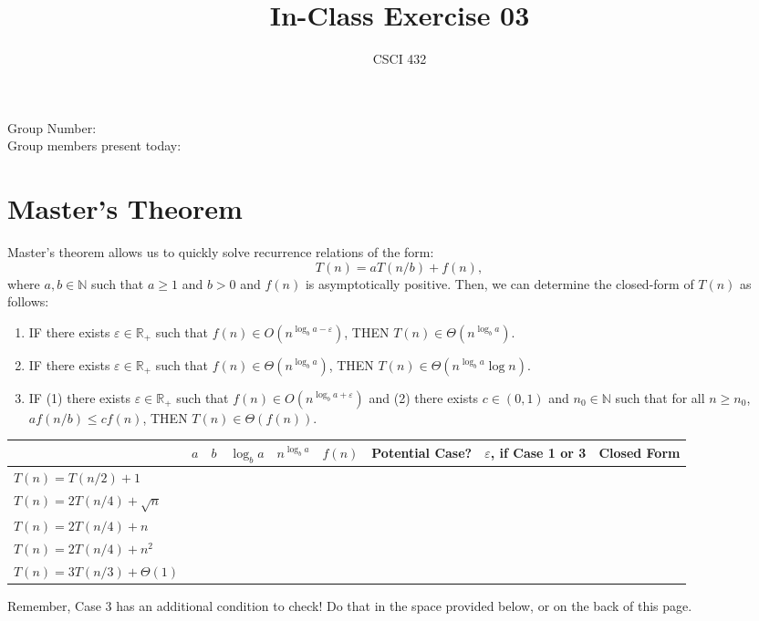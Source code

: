 \documentclass{article}
\title{In-Class Exercise 03}
\author{CSCI 432}
\def\R{{\mathbb R}}
\def\N{{\mathbb N}}
\begin{document}
\maketitle

\noindent
Group Number:\\
Group members present today:

\section*{Master's Theorem}

Master's theorem allows us to quickly solve recurrence relations of the form:
$$ T(n) = a T(n/b) + f(n),$$
where $a, b \in \N$ such that $a \geq 1$ and $b >0$ and $f(n)$ is asymptotically
positive.  Then, we can determine the closed-form of $T(n)$ as follows:
\begin{enumerate}
\item IF there exists $\varepsilon \in \R_+$ such that $f(n) \in O(n^{\log_b
a - \varepsilon})$, THEN $T(n) \in \Theta(n^{\log_b a})$.
\item IF there exists $\varepsilon \in \R_+$ such that $f(n) \in \Theta(n^{\log_b
a})$, THEN $T(n) \in \Theta(n^{\log_b a}\log n)$.
\item IF (1) there exists $\varepsilon \in \R_+$ such that $f(n) \in O(n^{\log_b
a + \varepsilon})$
and (2) there exists $c \in (0,1)$ and $n_0 \in \N$ such that for all $n
\geq n_0$, $a f(n/b) \leq c f(n)$, THEN $T(n) \in \Theta(f(n))$.
\end{enumerate}

\begin{table}[h!]
\centering
\begin{tabular}{|l|l|l|l|l|l|l|l|l|}
\hline
&  $a$ & $b$  & $\log_b a$  & $n^{\log_b a}$  & $f(n)$  & Potential
Case? & $\varepsilon$, if Case 1 or 3  & Closed Form \\ \hline
\hline
$T(n) = T(n/2)+1$             & &  &  &  &  & & & \\[5ex] \hline
$T(n) = 2 T(n/4) + \sqrt{n}$  & &  &  &  & &  & & \\[5ex] \hline
$T(n) = 2 T(n/4) + n$         & &  &  &  &  & & &  \\[5ex] \hline
$T(n) = 2 T(n/4) + n^2$       & &  &  &  &  & & & \\[5ex] \hline
$T(n) = 3 T(n/3) + \Theta(1)$ & &  &  &  & & & & \\[5ex] \hline
\end{tabular}
\end{table}
Remember, Case 3 has an additional condition to check! Do that in the space
provided below, or on the back of this page.\\
\fbox{\begin{minipage}{6.5in}\hfill\vspace{1in}\end{minipage}}
\end{document}
